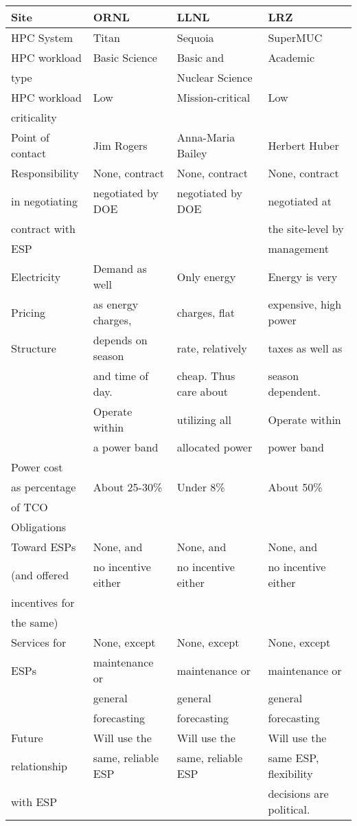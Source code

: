 \begin{table}
\centering
\label{tabIntw} 
\begin{tabular}{|l|l|l|l|}
 \hline
 \bf{Site} & \bf{ORNL} & \bf{LLNL} & \bf{LRZ} \\ 
 \hline
 HPC System & Titan & Sequoia & SuperMUC \\ 
 \hline
 HPC workload & Basic Science & Basic and & Academic \\
 type &&Nuclear Science&\\
 \hline
 HPC workload & Low & Mission-critical & Low\\
 criticality&&&\\
 \hline
Point of contact & Jim Rogers & Anna-Maria Bailey & Herbert Huber\\
\hline
Responsibility & None, contract & None, contract & None, contract \\
in negotiating & negotiated by DOE & negotiated by DOE & negotiated at \\
contract with&&&the site-level by\\
ESP &&&management\\
\hline
Electricity &Demand as well&Only energy & Energy is very\\
Pricing & as energy charges,&charges, flat&expensive, high power \\
Structure & depends on season&rate, relatively&taxes as well as\\
&and time of day. &cheap. Thus care about&season dependent.\\
&Operate within&utilizing all &Operate within\\
&a power band&allocated power&power band\\
\hline
Power cost & & & \\
as percentage&About 25-30\%&Under 8\%&About 50\%\\
of TCO&&&\\
\hline
Obligations &&&\\
Toward ESPs &None, and&None, and&None, and\\
(and offered & no incentive either& no incentive either&no incentive either\\
incentives for &&&\\
 the same)&&&\\
\hline
Services for &None, except&None, except&None, except\\
ESPs&maintenance or&maintenance or&maintenance or\\
&general&general&general\\
&forecasting&forecasting&forecasting\\
\hline
Future &Will use the &Will use the&Will use the \\
relationship &same, reliable ESP&same, reliable ESP&same ESP, flexibility\\
with ESP&&&decisions are political.\\
\hline
 \end{tabular}
 \end{table}

